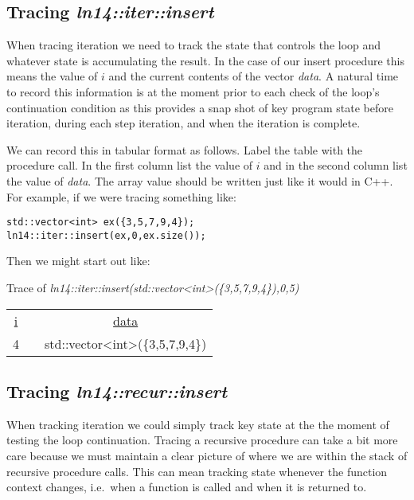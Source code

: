 \documentclass[nobib]{tufte-handout}
\begin{document}
\subsection*{Tracing \textit{ln14::iter::insert}}

When tracing iteration we need to track the state that controls the loop and whatever state is accumulating the result. In the case of our insert procedure this means the value of \(i\) and the current contents of the vector \textit{data}. A natural time to record this information is at the moment prior to each check of the loop's continuation condition as this provides a snap shot of key program state before iteration, during each step iteration, and when the iteration is complete.

We can record this in tabular format as follows. Label the table with the procedure call. In the first column list the value of \(i\) and in the second column list the value of \textit{data}. The array value should be written just like it would in C++. For example, if we were tracing something like:

\begin{lstlisting}
std::vector<int> ex({3,5,7,9,4});
ln14::iter::insert(ex,0,ex.size());
\end{lstlisting}

Then we might start out like:

\begin{framed}
Trace of \textit{ln14::iter::insert(std::vector<int>(\{3,5,7,9,4\}),0,5)}
\begin{center}
\begin{tabular}{ccc}
  \underline{i} & \hspace{.25in} & \underline{data} \\
  4 & & std::vector<int>(\{3,5,7,9,4\})
\end{tabular}
\end{center}
\end{framed}

\subsection*{Tracing \textit{ln14::recur::insert}}

When tracking iteration we could simply track key state at the the moment of testing the loop continuation. Tracing a recursive procedure can take a bit more care because we must maintain a clear picture of where we are within the stack of recursive procedure calls. This can mean tracking state whenever the function context changes, i.e.\ when a function is called and when it is returned to.
\end{document}
